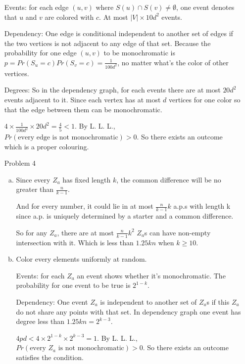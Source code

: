 \documentclass{article}
\begin{document}
\begin{itemize}
        Events: for each edge $(u, v)$ where $S(u) \cap S(v) \neq \emptyset$, one
        event denotes that $u$ and $v$ are colored with $c$. At most $|V| \times 10 d^2$ events.

        Dependency: One edge is conditional independent to another set of edges
        if the two vertices is not adjacent to any edge of that set.
        Because the probability for one edge $(u, v)$ to be monochromatic is 
        $p = Pr(S_u = c)Pr(S_v = c) = \frac{1}{100d^2}$, 
        no matter what's the color of other vertices.

        Degrees: So in the dependency graph,
        for each events there are at most $20d^2$ events adjacent to it.
        Since each vertex has at most $d$ vertices for one color so that
        the edge between them can be monochromatic.

        $4 \times \frac{1}{100d^2} \times 20d^2 = \frac{4}{5} < 1$.
        By L. L. L., $Pr(\text{every edge is not monochromatic}) > 0$.
        So there exists an outcome which is a proper colouring.

    \item[Problem 4]
        \begin{enumerate}[(a)]
            \item
                Since every $Z_a$ has fixed length $k$,
                the common difference will be no greater than $\frac{n}{k - 1}$.

                And for every number, it could lie in at most $\frac{n}{k - 1}k$
                a.p.s with length k since a.p. is uniquely determined by a starter
                and a common difference.

                So for any $Z_a$, there are at most $\frac{n}{k - 1} k^2$ $Z_a$s
                can have non-empty intersection with it. Which is less than
                $1.25kn$ when $k \ge 10$.
            \item
                Color every elements uniformly at random.

                Events: for each $Z_a$ an event shows whether it's monochromatic.
                The probability for one event to be true is $2^{1-k}$.

                Dependency: One event $Z_a$ is independent to another set of $Z_a$s
                if this $Z_a$ do not share any points with that set.
                In dependency graph one event has degree less than $1.25kn = 2^{k-3}$.

                $4 p d < 4 \times 2^{1-k} \times 2^{k-3} = 1$.
                By L. L. L., $Pr(\text{every $Z_a$ is not monochromatic}) > 0$.
                So there exists an outcome satisfies the condition.
        \end{enumerate}

\end{itemize}
\end{document}
